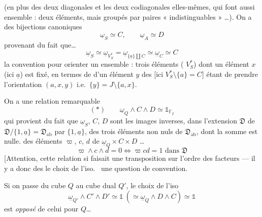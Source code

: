 \documentclass[11pt,a4paper]{article}
\begin{document}
(en plus des deux diagonales et les deux codiagonales elles-mêmes, qui font
aussi   ensemble : deux éléments, mais
groupés par paires « indistinguables » \ldots). On a des bijections
canoniques
\[
  \underline{\omega}_S \simeq C, \qquad \underline{\omega}_A \simeq D
\]
provenant du fait que\ldots
\[
  \underline{\omega}_S \simeq \underline{\omega}_{V_S^*}
  = \underline{\omega}_{\{\underline{a}\} \amalg C}
  \simeq \underline{\omega}_C \simeq C
\]
la convention pour orienter un ensemble : trois éléments (
$V_S^*$) dont un élément $x$ (ici $\underline{a}$) est fixé, en termes de
 d'un élément $y$ des  
[ici $V_S^* \setminus \{a\} = C$] étant de prendre l'orientation
$(a, x, y)$  i.e.\ $\{y\} = J \setminus \{a, x\}$.

On a une relation remarquable
\[
  (*) \qquad \underline{\omega}_Q \wedge C \wedge D \simeq \mathbb{1}_{\mathbb{F}_2}
\]
qui provient du fait que $\underline{\omega}_S$, $C$, $D$ sont les images
inverses, dans l'extension $\mathfrak{D}$ de
$\mathfrak{D}/\{1, \underline{a}\} = \mathfrak{D}_{\mathrm{ab}}$ par
$\{1, \underline{a}\}$, des trois éléments non nuls de
$\mathfrak{D}_{\mathrm{ab}}$, dont la  somme est nulle.
 des éléments $\varpi$, $c$, $d$ de
$\underline{\omega}_Q \times C \times D$ \struck{\ill{}} \ldots
\[
  \varpi \wedge c \wedge d = 0 \iff \varpi c d = 1 \text{ dans } \mathfrak{D}
\]
[Attention, cette relation   si \ill{}
faisait une transposition sur l'ordre des facteurs --- il y a donc
\struck{\ill{}} des \struck{\ill{}} le choix de l'iso.\  une
question de convention.

Si on passe du cube $Q$ au cube dual $Q'$, le choix de l'iso
\[
  \underline{\omega}_{Q'} \wedge C' \wedge D' \simeq \mathbb{1}
  \ (\simeq \underline{\omega}_Q \wedge D \wedge C) \simeq \mathbb{1}
\]
est \emph{opposé} de celui pour $Q$\ldots
{}
\end{document}
